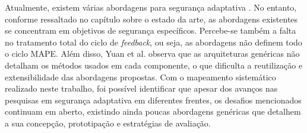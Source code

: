 \documentclass[tid,table]{texufpel} %
\begin{document}
Atualmente, existem várias abordagens para segurança adaptativa \cite{elkhodary07, yuan12}. No entanto, conforme ressaltado no capítulo sobre o estado da arte, as abordagens existentes se concentram em objetivos de segurança específicos. Percebe-se também a falta no tratamento total do ciclo de \textit{feedback}, ou seja, as abordagens não definem todo o ciclo MAPE. Além disso, Yuan et al. observa que as arquiteturas genéricas não detalham os métodos usados em cada componente, o que dificulta a reutilização e extensibilidade das abordagens propostas. Com o mapeamento sistemático realizado neste trabalho, foi possível identificar que apesar dos avanços nas pesquisas em segurança adaptativa em diferentes frentes, os desafios mencionados continuam em aberto, existindo ainda poucas abordagens genéricas que detalhem a sua concepção, prototipação e estratégias de avaliação.
 





\end{document}
